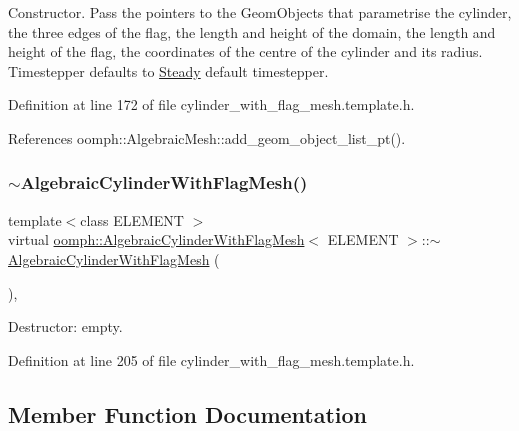 Constructor. Pass the pointers to the Geom\+Objects that parametrise the cylinder, the three edges of the flag, the length and height of the domain, the length and height of the flag, the coordinates of the centre of the cylinder and its radius. Timestepper defaults to \hyperlink{classoomph_1_1Steady}{Steady} default timestepper. 



Definition at line 172 of file cylinder\+\_\+with\+\_\+flag\+\_\+mesh.\+template.\+h.



References oomph\+::\+Algebraic\+Mesh\+::add\+\_\+geom\+\_\+object\+\_\+list\+\_\+pt().

\mbox{\label{classoomph_1_1AlgebraicCylinderWithFlagMesh_ac7e92a8dc3add0cd1f666dc8c9f8ca6f}} 
\subsubsection{\texorpdfstring{$\sim$\+Algebraic\+Cylinder\+With\+Flag\+Mesh()}{~AlgebraicCylinderWithFlagMesh()}}
{\footnotesize\ttfamily template$<$class E\+L\+E\+M\+E\+NT $>$ \\
virtual \hyperlink{classoomph_1_1AlgebraicCylinderWithFlagMesh}{oomph\+::\+Algebraic\+Cylinder\+With\+Flag\+Mesh}$<$ E\+L\+E\+M\+E\+NT $>$\+::$\sim$\hyperlink{classoomph_1_1AlgebraicCylinderWithFlagMesh}{Algebraic\+Cylinder\+With\+Flag\+Mesh} (\begin{DoxyParamCaption}{ }\end{DoxyParamCaption})\hspace{0.3cm}{\ttfamily [inline]}, {\ttfamily [virtual]}}



Destructor\+: empty. 



Definition at line 205 of file cylinder\+\_\+with\+\_\+flag\+\_\+mesh.\+template.\+h.



\subsection{Member Function Documentation}
\mbox{\label{classoomph_1_1AlgebraicCylinderWithFlagMesh_a5e1e770e82577e5702470d8b87f8599d}} 
